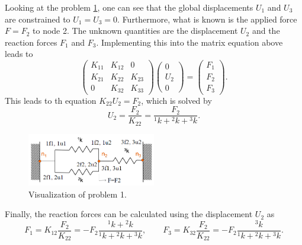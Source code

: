 \documentclass[a4paper,11pt]{article}
\numberwithin{equation}{section}
\begin{document}
{Looking at the problem \cref{fig:problem_1}, one can see that the global displacements $U_1$ and $U_3$ are constrained to $U_1 = U_3 = 0$. Furthermore, what is known is the applied force $F= F_2$ to node 2. The unknown quantities are the displacement $U_2$ and the reaction forces $F_1$ and $F_3$. Implementing this into the matrix equation above leads to \begin{equation}
	\begin{pmatrix}
		K_{11} & K_{12} & 0 \\
		K_{21} & K_{22} & K_{23} \\
		0 & K_{32} & K_{33}
	\end{pmatrix}\begin{pmatrix}
		0 \\ U_2 \\ 0
	\end{pmatrix} = \begin{pmatrix}
		F_1 \\ F_2 \\ F_3
	\end{pmatrix}.
\end{equation} This leads to th equation $K_{22}U_2 = F_2$, which is solved by \begin{equation}
	U_2 = \frac{F_2}{K_{22}} = \frac{F_2}{{}^1k + {}^2k + {}^3k}.
\end{equation}
\begin{figure}[h]
	\centering
	\includegraphics[width=0.5\textwidth]{figures/problem_1.png}
	\caption{Visualization of problem 1.}
	\label{fig:problem_1}
\end{figure}
Finally, the reaction forces can be calculated using the displacement $U_2$ as \begin{equation}
	F_1 = K_{12}\frac{F_2}{K_{22}} = -F_2\frac{{}^1k + {}^2k}{{}^1k + {}^2k + {}^3k}, \qquad F_3 = K_{32}\frac{F_2}{K_{22}} = -F_2\frac{{}^3k}{{}^1k + {}^2k + {}^3k}.
\end{equation}
}
\end{document}
